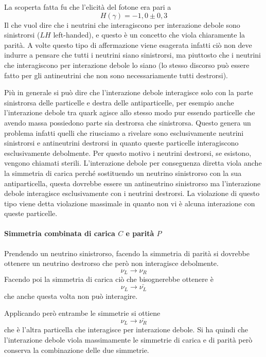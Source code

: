La scoperta fatta fu che l'elicità del fotone era pari a 
\[
H(\gamma)=-1,0\pm 0,3
\]
Il che vuol dire che i neutrini che interagiscono per interazione debole sono sinistrorsi ($LH$ left-handed), e questo è un concetto che viola chiaramente la parità.
A volte questo tipo di affermazione viene esagerata infatti ciò non deve indurre a pensare che tutti i neutrini siano sinistrorsi, ma piuttosto che i neutrini che interagiscono per interazione debole lo siano (lo stesso discorso può essere fatto per gli antineutrini che non sono necessariamente tutti destrorsi).

Più in generale si può dire che l'interazione debole interagisce solo con la parte sinistrorsa delle particelle e destra delle antiparticelle, per esempio anche l'interazione debole tra quark agisce allo stesso modo pur essendo particelle che avendo massa possiedono parte sia destrorsa che sinistrorsa.
Questo genera un problema infatti quelli che riusciamo a rivelare sono esclusivamente neutrini sinistrorsi e antineutrini destrorsi in quanto queste particelle interagiscono esclusivamente debolmente.
Per questo motivo i neutrini destrorsi, se esistono, vengono chiamati sterili.
L'interazione debole per conseguenza diretta viola anche la simmetria di carica perché sostituendo un neutrino sinistrorso con la sua antiparticella, questa dovrebbe essere un antineutrino sinistrorso ma l'interazione debole interagisce esclusivamente con i neutrini destrorsi.
La violazione di questo tipo viene detta violazione massimale in quanto non vi è alcuna interazione con queste particelle.

\paragraph{Simmetria combinata di carica $C$ e parità $P$}
Prendendo un neutrino sinistrorso, facendo la simmetria di parità si dovrebbe ottenere un neutrino destrorso che però non interagisce debolmente.
\begin{equation}
\nu_L\longrightarrow \nu_R
\end{equation}
Facendo poi la simmetria di carica ciò che bisognerebbe ottenere è
\begin{equation}
\nu_L\longrightarrow \bar{\nu_L}
\end{equation}
che anche questa volta non può interagire.

Applicando però entrambe le simmetrie si ottiene 
\begin{equation}
\nu_L\longrightarrow \bar{\nu_R}
\end{equation}
che è l'altra particella che interagisce per interazione debole.
Si ha quindi che l'interazione debole viola massimamente le simmetrie di carica e di parità però conserva la combinazione delle due simmetrie.

